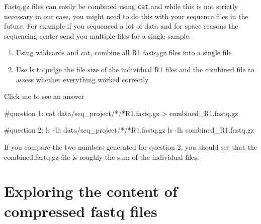 \documentclass[
  letterpaper,
  DIV=11,
  numbers=noendperiod]{scrreprt}
\newenvironment{Shaded}{}{}
\newcommand{\AttributeTok}[1]{\textcolor[rgb]{0.84,0.23,0.29}{#1}}
\newcommand{\CommentTok}[1]{\textcolor[rgb]{0.42,0.45,0.49}{#1}}
\newcommand{\FunctionTok}[1]{\textcolor[rgb]{0.44,0.26,0.76}{#1}}
\newcommand{\NormalTok}[1]{\textcolor[rgb]{0.14,0.16,0.18}{#1}}
\newcommand{\OperatorTok}[1]{\textcolor[rgb]{0.14,0.16,0.18}{#1}}
\newcommand{\PreprocessorTok}[1]{\textcolor[rgb]{0.84,0.23,0.29}{#1}}
\providecommand{\tightlist}{%
  \setlength{\itemsep}{0pt}\setlength{\parskip}{0pt}}\usepackage{longtable,booktabs,array}
\begin{document}
\begin{tcolorbox}[enhanced jigsaw, title=\textcolor{quarto-callout-caution-color}{\faFire}\hspace{0.5em}{Exercise}, colframe=quarto-callout-caution-color-frame, opacitybacktitle=0.6, rightrule=.15mm, arc=.35mm, left=2mm, colbacktitle=quarto-callout-caution-color!10!white, bottomrule=.15mm, leftrule=.75mm, toprule=.15mm, opacityback=0, bottomtitle=1mm, colback=white, toptitle=1mm, breakable, titlerule=0mm, coltitle=black]

Fastq.gz files can easily be combined using \texttt{cat} and while this
is not strictly necessary in our case, you might need to do this with
your sequence files in the future. For example if you sequenced a lot of
data and for space reasons the sequencing center send you multiple files
for a single sample.

\begin{enumerate}
\def\labelenumi{\arabic{enumi}.}
\tightlist
\item
  Using wildcards and cat, combine all R1 fastq.gz files into a single
  file
\item
  Use ls to judge the file size of the individual R1 files and the
  combined file to assess whether everything worked correctly
\end{enumerate}

Click me to see an answer

\begin{Shaded}
\begin{Highlighting}[]
\CommentTok{\#question 1:}
\FunctionTok{cat}\NormalTok{ data/seq\_project/}\PreprocessorTok{*}\NormalTok{/}\PreprocessorTok{*}\NormalTok{R1.fastq.gz }\OperatorTok{\textgreater{}}\NormalTok{ combined\_R1.fastq.gz}

\CommentTok{\#question 2:}
\FunctionTok{ls} \AttributeTok{{-}lh}\NormalTok{ data/seq\_project/}\PreprocessorTok{*}\NormalTok{/}\PreprocessorTok{*}\NormalTok{R1.fastq.gz}
\FunctionTok{ls} \AttributeTok{{-}lh}\NormalTok{ combined\_R1.fastq.gz}
\end{Highlighting}
\end{Shaded}

If you compare the two numbers generated for question 2, you should see
that the combined.fastq.gz file is roughly the sum of the individual
files.

\end{tcolorbox}

\section{Exploring the content of compressed fastq
files}\label{exploring-the-content-of-compressed-fastq-files}
\end{document}
